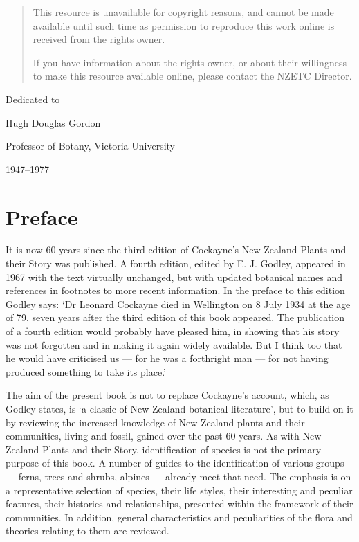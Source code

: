 \begin{quote}
    This resource is unavailable for copyright reasons, and cannot be made available until such time as permission to reproduce this work online is received from the rights owner.

    If you have information about the rights owner, or about their willingness to make this resource available online, please contact the NZETC Director.
\end{quote}

Dedicated to\par
Hugh Douglas Gordon\par
Professor of Botany, Victoria University\par
1947–1977

\chapter*{Preface}

It is now 60 years since the third edition of Cockayne's New Zealand Plants and their Story was published. A fourth edition, edited by E. J. Godley, appeared in 1967 with the text virtually unchanged, but with updated botanical names and references in footnotes to more recent information. In the preface to this edition Godley says: `Dr Leonard Cockayne died in Wellington on 8 July 1934 at the age of 79, seven years after the third edition of this book appeared. The publication of a fourth edition would probably have pleased him, in showing that his story was not forgotten and in making it again widely available. But I think too that he would have criticised us --- for he was a forthright man --- for not having produced something to take its place.'

The aim of the present book is not to replace Cockayne's account, which, as Godley states, is `a classic of New Zealand botanical literature', but to build on it by reviewing the increased knowledge of New Zealand plants and their communities, living and fossil, gained over the past 60 years. As with New Zealand Plants and their Story, identification of species is not the primary purpose of this book. A number of guides to the identification of various groups --- ferns, trees and shrubs, alpines --- already meet that need. The emphasis is on a representative selection of species, their life styles, their interesting and peculiar features, their histories and relationships, presented within the framework of their communities. In addition, general characteristics and peculiarities of the flora and theories relating to them are reviewed.

